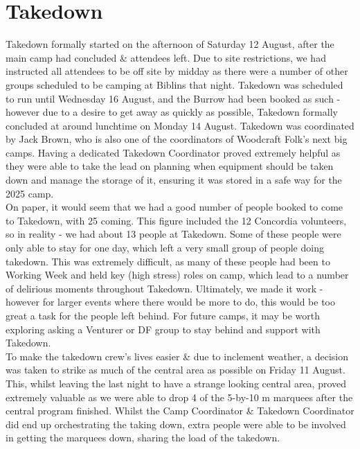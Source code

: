 \chapter{Takedown}

Takedown formally started on the afternoon of Saturday 12 August, after the main camp had concluded \& attendees left. Due to site restrictions, we had instructed all attendees to be off site by midday as there were a number of other groups scheduled to be camping at Biblins that night. Takedown was scheduled to run until Wednesday 16 August, and the Burrow had been booked as such - however due to a desire to get away as quickly as possible, Takedown formally concluded at around lunchtime on Monday 14 August. Takedown was coordinated by Jack Brown, who is also one of the coordinators of Woodcraft Folk's next big camps. Having a dedicated Takedown Coordinator proved extremely helpful as they were able to take the lead on planning when equipment should be taken down and manage the storage of it, ensuring it was stored in a safe way for the 2025 camp.\\

On paper, it would seem that we had a good number of people booked to come to Takedown, with 25 coming. This figure included the 12 Concordia volunteers, so in reality - we had about 13 people at Takedown. Some of these people were only able to stay for one day, which left a very small group of people doing takedown. This was extremely difficult, as many of these people had been to Working Week and held key (high stress) roles on camp, which lead to a number of delirious moments throughout Takedown. Ultimately, we made it work - however for larger events where there would be more to do, this would be too great a task for the people left behind. For future camps, it may be worth exploring asking a Venturer or DF group to stay behind and support with Takedown. \\

To make the takedown crew's lives easier \& due to inclement weather, a decision was taken to strike as much of the central area as possible on Friday 11 August. This, whilst leaving the last night to have a strange looking central area, proved extremely valuable as we were able to drop 4 of the 5-by-10 m marquees after the central program finished. Whilst the Camp Coordinator \& Takedown Coordinator did end up orchestrating the taking down, extra people were able to be involved in getting the marquees down, sharing the load of the takedown.\\

